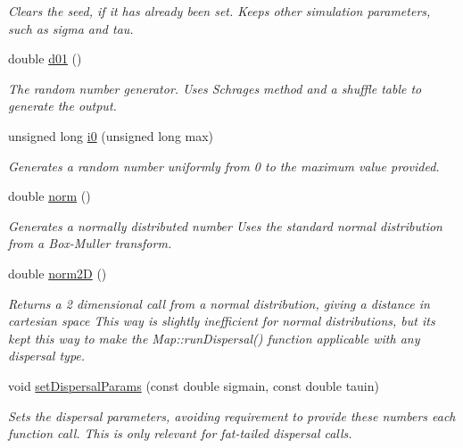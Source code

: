 \begin{DoxyCompactItemize}
\begin{DoxyCompactList}\small\item\em Clears the seed, if it has already been set. Keeps other simulation parameters, such as sigma and tau. \end{DoxyCompactList}\item 
double \hyperlink{class_n_rrand_a0043ba1c33b3dcb3b98210fb432f9f6c}{d01} ()
\begin{DoxyCompactList}\small\item\em The random number generator. Uses Schrage\textquotesingle{}s method and a shuffle table to generate the output. \end{DoxyCompactList}\item 
unsigned long \hyperlink{class_n_rrand_abb6db53dd1fdd9388b39e5dcd26c13ac}{i0} (unsigned long max)
\begin{DoxyCompactList}\small\item\em Generates a random number uniformly from 0 to the maximum value provided. \end{DoxyCompactList}\item 
double \hyperlink{class_n_rrand_aa57a6e9bae94c2df5a00473ba6fa900d}{norm} ()
\begin{DoxyCompactList}\small\item\em Generates a normally distributed number Uses the standard normal distribution from a Box-\/\+Muller transform. \end{DoxyCompactList}\item 
double \hyperlink{class_n_rrand_a754e5083299d12c1b33e8c66519d057e}{norm2D} ()
\begin{DoxyCompactList}\small\item\em Returns a 2 dimensional call from a normal distribution, giving a distance in cartesian space This way is slightly inefficient for normal distributions, but it\textquotesingle{}s kept this way to make the Map\+::run\+Dispersal() function applicable with any dispersal type. \end{DoxyCompactList}\item 
void \hyperlink{class_n_rrand_a5679f458940de730f527772ca27db5ad}{set\+Dispersal\+Params} (const double sigmain, const double tauin)
\begin{DoxyCompactList}\small\item\em Sets the dispersal parameters, avoiding requirement to provide these numbers each function call. This is only relevant for fat-\/tailed dispersal calls. \end{DoxyCompactList}\item 

\end{DoxyCompactItemize}
